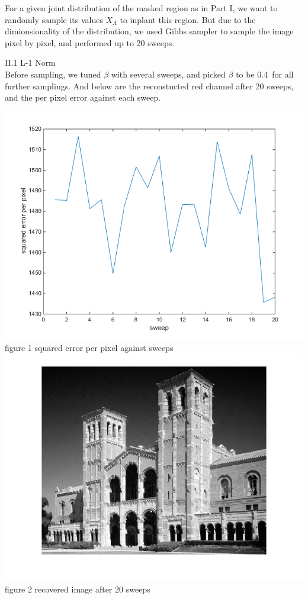 \documentclass[12pt]{article}
\newenvironment{problem}[2][Part]{\begin{trivlist}
\item[\hskip \labelsep {\bfseries #1}\hskip \labelsep {\bfseries #2}]}{\end{trivlist}}
\newcommand{\bestBeta}{0.4}
\begin{document}
\begin{problem}{II Gibbs Sampler}
\item{}
For a given joint distribution of the masked region as in Part I, we want to randomly sample its values $X_\Lambda$ to inplant this region. But due to the dimionsionality of the distribution, we used Gibbs sampler to sample the image pixel by pixel, and performed up to 20 sweeps.\\

\item{II.1 L-1 Norm\\}
Before sampling, we tuned $\beta$ with several sweeps, and picked $\beta$ to be \bestBeta \ for all further samplings. And below are the reconstucted red channel after 20 sweeps, and the per pixel error against each sweep.
\begin{center}
	\includegraphics[width=14cm]{results/error_gibbs_04.png}{\\figure 1 squared error per pixel against sweeps}
	\includegraphics[width=14cm]{results/recover_gibbs_04.png}{\\figure 2 recovered image after 20 sweeps}
\end{center}


\end{problem}
\end{document}
